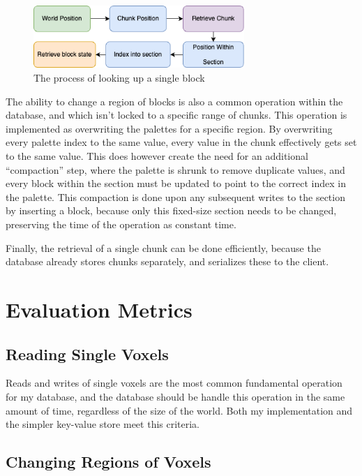 \documentclass[10pt,twocolumn]{article}
\begin{document}
\begin{figure}
  \centering
  \includegraphics[width=8cm]{block-search.drawio.png}
  \caption{The process of looking up a single block}
  \label{fig:lookup}
\end{figure}

The ability to change a region of blocks is also a common operation within the
database, and which isn't locked to a specific range of chunks. This operation
is implemented as overwriting the palettes for a specific region. By overwriting
every palette index to the same value, every value in the chunk effectively gets
set to the same value. This does however create the need for an additional
``compaction'' step, where the palette is shrunk to remove duplicate values, and
every block within the section must be updated to point to the correct index in
the palette. This compaction is done upon any subsequent writes to the section
by inserting a block, because only this fixed-size section needs to be changed,
preserving the time of the operation as constant time.

Finally, the retrieval of a single chunk can be done efficiently, because the
database already stores chunks separately, and serializes these to the client.


\section{Evaluation Metrics}

\subsection{Reading Single Voxels}

Reads and writes of single voxels are the most common fundamental operation for
my database, and the database should be handle this operation in the same amount
of time, regardless of the size of the world. Both my implementation and the
simpler key-value store meet this criteria.

\subsection{Changing Regions of Voxels}
\end{document}
